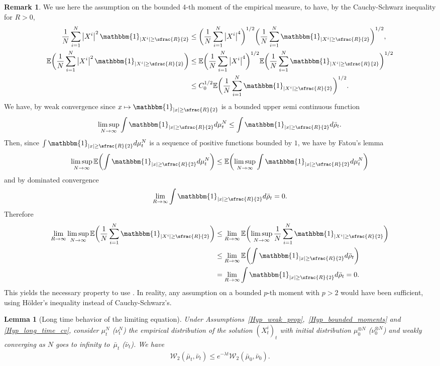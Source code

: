\documentclass[JEP,XML,SOM,Unicode,published]{cedram}
\let\mathds\mathbbm
\newcommand\mto{\mathchoice{\longmapsto}{\mapsto}{\mapsto}{\mapsto}}
\theoremstyle{plain}
\newtheorem{lemma}{Lemma}[section]
\theoremstyle{definition}
\newtheorem{remark}{Remark}[section]
\begin{document}
\begin{remark}
We use here the assumption on the bounded 4-th moment of the empirical measure, to have, by the Cauchy-Schwarz inequality for $R>0$,
\begin{align*}
\frac{1}{N}\sum_{i=1}^N\left|X^i\right|^2\mathds{1}_{|X^i|\geq \sfrac{R}{2}}&\leq \biggl(\frac{1}{N}\sum_{i=1}^N\left|X^i\right|^{4}\biggr)^{1/2}\biggl(\frac{1}{N}\sum_{i=1}^N\mathds{1}_{|X^i|\geq \sfrac{R}{2}}\biggr)^{1/2},\\
\mathbb{E}\biggl(\frac{1}{N}\sum_{i=1}^N\left|X^i\right|^2\mathds{1}_{|X^i|\geq \sfrac{R}{2}}\biggr)&\leq \mathbb{E}\biggl(\frac{1}{N}\sum_{i=1}^N\left|X^i\right|^{4}\biggr)^{1/2}\mathbb{E}\biggl(\frac{1}{N}\sum_{i=1}^N\mathds{1}_{|X^i|\geq \sfrac{R}{2}}\biggr)^{1/2}\\
&\leq C_0^{1/2}\mathbb{E}\biggl(\frac{1}{N}\sum_{i=1}^N\mathds{1}_{|X^i|\geq \sfrac{R}{2}}\biggr)^{1/2}.
\end{align*}
We have, by weak convergence since $x\mto\mathds{1}_{|x|\geq \sfrac{R}{2}}$ is a bounded upper semi continuous function
\[
\limsup_{N\to\infty}\int\mathds{1}_{|x|\geq \sfrac{R}{2}}d\mu^N_t\leq\int\mathds{1}_{|x|\geq \sfrac{R}{2}}d\bar{\rho}_t.
\]
Then, since $\int\mathds{1}_{|x|\geq \sfrac{R}{2}}d\mu^N_t$ is a sequence of positive functions bounded by $1$, we have by Fatou's lemma
\[
\limsup_{N\to\infty}\mathbb{E}\biggl(\int\mathds{1}_{|x|\geq \sfrac{R}{2}}d\mu^N_t\biggr)\leq\mathbb{E}\biggl(\limsup_{N\to\infty}\int\mathds{1}_{|x|\geq \sfrac{R}{2}}d\mu^N_t\biggr)
\]
and by dominated convergence
\[
\lim_{R\to\infty}\int\mathds{1}_{|x|\geq \sfrac{R}{2}}d\bar{\rho}_t=0.
\]
Therefore
\begin{align*}
\lim_{R\to\infty}\limsup_{N\to\infty}\mathbb{E}\biggl(\frac{1}{N}\sum_{i=1}^N\mathds{1}_{|X^i|\geq \sfrac{R}{2}}\biggr)&\leq \lim_{R\to\infty}\mathbb{E}\biggl(\limsup_{N\to\infty}\frac{1}{N}\sum_{i=1}^N\mathds{1}_{|X^i|\geq \sfrac{R}{2}}\biggr)\\
&\leq \lim_{R\to\infty}\mathbb{E}\biggl(\int\mathds{1}_{|x|\geq \sfrac{R}{2}}d\bar{\rho}_t\biggr)\\
&=\lim_{R\to\infty}\int\mathds{1}_{|x|\geq \sfrac{R}{2}}d\bar{\rho}_t=0.
\end{align*}
This yields the necessary property to use \cite[Th.\,6.9]{villani2008optimal}. In reality, any assumption on a bounded $p$-th moment with $p>2$ would have been sufficient, using Hölder's inequality instead of Cauchy-Schwarz's.
\end{remark}

\begin{lemma}[Long time behavior of the limiting equation]
Under Assumptions~\ref{Hyp_weak_prop},~\ref{Hyp_bounded_moments} and \ref{Hyp_long_time_cv}, consider $\mu^N_t$ (\resp $\nu^N_t$) the empirical distribution of the solution $(X^i_t)_t$ with initial distribution $\mu_0^{\otimes N}$ (\resp $\nu_0^{\otimes N}$) and weakly converging as $N$ goes to infinity to~$\bar{\mu}_t$ (\resp $\bar{\nu}_t$). We have
\begin{align*}
\mathcal{W}_2\left(\bar{\mu}_t, \bar{\nu}_t\right)\leq e^{-\lambda t}\mathcal{W}_2(\bar{\mu}_0, \bar{\nu}_0).
\end{align*}
\end{lemma}
\end{document}
